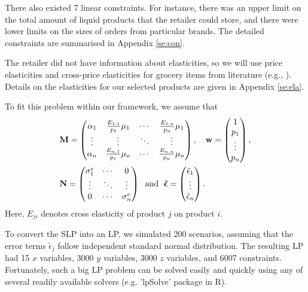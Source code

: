 \documentclass[a4paper,11pt]{article}
\begin{document}
There also existed 7 linear constraints. For instance, there was an upper limit on the total amount of liquid products that the retailer could store, and there were lower limits on the sizes of orders from particular brands. The detailed constraints are summarised in Appendix \ref{se:con}.

The retailer did not have information about elasticities, so we will use price elasticities and cross-price elasticities for grocery items from literature (e.g., \cite{LC03,ZW03,VD99,HPQ99}). Details on the elasticities for our selected products are given in Appendix \ref{se:ela}.

To fit this problem within our framework, we assume that
\[
\begin{aligned}
&\mathbf{M} = 
\begin{pmatrix}
\alpha_1&\frac{E_{1,1}}{p_1}\mu_1&\cdots&\frac{E_{1,n}}{p_n}\mu_1\\
\vdots&\vdots&\ddots&\vdots\\
\alpha_n&\frac{E_{n,1}}{p_1}\mu_n&\cdots&\frac{E_{n,n}}{p_n}\mu_n
\end{pmatrix}, \quad
\mathbf{w} = 
\begin{pmatrix}
1\\
p_1\\
\vdots\\
p_n
\end{pmatrix}, \\
&\mathbf{N} = 
\begin{pmatrix}
\sigma_1^e&\cdots&0\\
\vdots&\ddots&\vdots\\
0&\cdots&\sigma_n^e\\
\end{pmatrix}
\; \mbox{ and } \; 
\mbox{\boldmath$\tilde{\epsilon}$} = 
\begin{pmatrix}
\tilde{\epsilon}_1\\
\vdots\\
\tilde{\epsilon}_n
\end{pmatrix}.
\end{aligned}
\]
Here, $E_{ji}$ denotes cross elasticity of product $j$ on product $i$.

To convert the SLP into an LP, we simulated $200$ scenarios, assuming that the error terms $\tilde{\epsilon}_j$ follow independent standard normal distribution. The resulting LP had 15 $x$ variables, 3000 $y$ variables, 3000 $z$ variables, and 6007 constraints. Fortunately, such a big LP problem can be solved easily and quickly using any of several readily available solvers (e.g. 'lpSolve' package in R).
\end{document}
